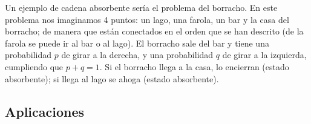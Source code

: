 \begin{ejemplo}
Un ejemplo de cadena absorbente sería el problema del borracho. En este problema nos imaginamos 4 puntos: un lago, una farola, un bar y la casa del borracho; de manera que están conectados en el orden que se han descrito (de la farola se puede ir al bar o al lago). El borracho sale del bar y tiene una probabilidad $p$ de girar a la derecha, y una probabilidad $q$ de girar a la izquierda, cumpliendo que $p+q=1$. Si el borracho llega a la casa, lo encierran (estado absorbente); si llega al lago se ahoga (estado absorbente).
\end{ejemplo}

\subsection{Aplicaciones}
